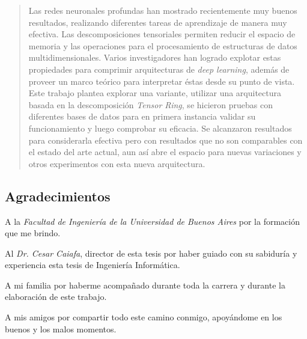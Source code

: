 \documentclass[spanish]{article}
\theoremstyle{definition}
\theoremstyle{remark}
\numberwithin{equation}{section}
\numberwithin{equation}{section} %
\begin{document}

\cleardoublepage
    \renewcommand{\abstractname}{Resumen}
    \setcounter{page}{1}
    \begin{abstract}
    Las redes neuronales profundas han mostrado recientemente muy buenos resultados, realizando diferentes tareas de aprendizaje de manera muy efectiva. Las descomposiciones tensoriales permiten reducir el espacio de memoria y las operaciones para el procesamiento de estructuras de datos multidimensionales. Varios investigadores han logrado explotar estas propiedades para comprimir arquitecturas de {\it deep learning}, además de proveer un marco teórico para interpretar éstas desde su punto de vista. Este trabajo plantea explorar una variante, utilizar una arquitectura basada en la descomposición {\it Tensor Ring}, se hicieron pruebas con diferentes bases de datos para en primera instancia validar su funcionamiento y luego comprobar su eficacia. Se alcanzaron resultados para considerarla efectiva pero con resultados que no son comparables con el estado del arte actual, aun así abre el espacio para nuevas variaciones y otros experimentos con esta nueva arquitectura. 
    
    \par
    
    \end{abstract}
    
\clearpage
    \begin{center}
    \chapter{\Large \bf Agradecimientos}
    \end{center}
    
    \vspace*{0.25in}

     A la \textit{Facultad de Ingeniería de la Universidad de Buenos Aires} por la formación que me brindo. 
       \\  \par
    Al \textit{Dr. Cesar Caiafa}, director de esta tesis por haber guiado con su sabiduría y experiencia esta tesis de Ingeniería Informática.  
    \\ \par
    A mi familia por haberme acompañado durante toda la carrera y durante la elaboración de este trabajo.   
   \\ \par
    A mis amigos por compartir todo este camino conmigo, apoyándome en los buenos y los malos momentos.
   \\ \par
\end{document}
